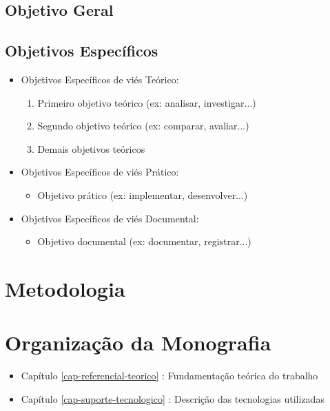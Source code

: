 \subsection{Objetivo Geral}
\label{1-objetivos-gerais}

\subsection{Objetivos Específicos}
\label{1-objetivos-especificos}

\begin{itemize}
\item Objetivos Específicos de viés Teórico:
\begin{enumerate}
\item Primeiro objetivo teórico (ex: analisar, investigar...)
\item Segundo objetivo teórico (ex: comparar, avaliar...)
\item Demais objetivos teóricos
\end{enumerate}
\item Objetivos Específicos de viés Prático:
\begin{itemize}
\item Objetivo prático (ex: implementar, desenvolver...)
\end{itemize}
\item Objetivos Específicos de viés Documental:
\begin{itemize}
\item Objetivo documental (ex: documentar, registrar...)
\end{itemize}
\end{itemize}

\section{Metodologia}
\label{1-metodologia}

\section{Organização da Monografia}
\label{1-organizacao}

\begin{itemize}
\item Capítulo \ref{cap-referencial-teorico} : Fundamentação teórica do trabalho
\item Capítulo \ref{cap-suporte-tecnologico} : Descrição das tecnologias utilizadas
\end{itemize}
